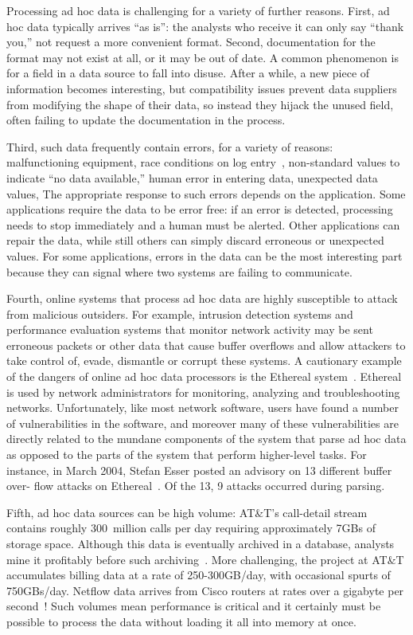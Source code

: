 \documentclass[11pt]{article}
\begin{document}
Processing ad hoc data is challenging for a variety of further reasons. 
First, ad hoc data typically arrives ``as is'': the analysts
who receive it can only say ``thank you,'' not request a more
convenient format.  Second, documentation for the format may not exist
at all, or it may be out of date.  A common phenomenon is for a field
in a data source to fall into disuse.  After a while, a new piece of
information becomes interesting, but compatibility issues prevent data
suppliers from modifying the shape of their data, so instead they
hijack the unused field, often failing to update the documentation in
the process.

Third, such data frequently contain errors, for a variety of reasons:
malfunctioning equipment, race conditions on log entry~\cite{wpp},
non-standard values to indicate ``no data available,'' human error in
entering data, unexpected data values, \etc{} The appropriate response
to such errors depends on the application.  Some applications require
the data to be error free: if an error is detected, processing needs
to stop immediately and a human must be alerted.  Other applications
can repair the data, while still others can simply discard erroneous
or unexpected values.  For some applications, errors in the data can
be the most interesting part because they can signal where two systems
are failing to communicate.

Fourth, online systems that process ad hoc data
are highly susceptible to attack from malicious outsiders.
For example, intrusion detection systems
and performance evaluation systems that monitor network activity 
may be sent erroneous packets or other data that cause buffer overflows
and allow attackers to take control of, evade, dismantle or corrupt these
systems.  A cautionary example of the dangers of online ad hoc data
processors is the Ethereal system~\cite{ethereal}. Ethereal is used by network administrators for monitoring, analyzing
and troubleshooting networks. Unfortunately, like most network software, users have found a number of
vulnerabilities in the software, and moreover many of these vulnerabilities are directly related to the mundane
components of the system that parse ad hoc data as opposed to the parts of the system that perform
higher-level tasks. For instance, in March 2004, Stefan Esser posted an advisory on 13 different buffer over-
flow attacks on Ethereal~\cite{etherealvulnerabilities}. Of the 13, 9 attacks occurred during parsing.

Fifth, ad hoc data sources can be high volume:
AT\&T's call-detail stream contains roughly 300~million calls per day
requiring approximately 7GBs of storage space. Although this data is
eventually archived in a database, analysts mine it profitably before
such archiving~\cite{kdd98,kdd99}. More challenging, the \ningaui{}
project at AT\&T accumulates billing data at a rate of 250-300GB/day,
with occasional spurts of 750GBs/day. Netflow data arrives from Cisco
routers at rates over a gigabyte per second~\cite{gigascope}! Such
volumes mean performance is critical and it certainly
must be possible to process the data without loading
it all into memory at once.
\end{document}
